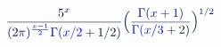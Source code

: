 \documentclass[12pt]{article}
\begin{document}
\makeatletter
\renewcommand*{\@textcolor}[3]{%
  \protect\leavevmode
  \begingroup
    \color#1{#2}#3%
  \endgroup
}
\makeatother
\begin{displaymath}
\mathcolor[RGB]{0,0,15}{\frac { \mathcolor[RGB]{0,0,30}{5} ^ { \mathcolor[RGB]{0,0,45}{x} } } { \mathcolor[RGB]{0,0,60}{(} \mathcolor[RGB]{0,0,75}{2} \mathcolor[RGB]{0,0,90}{\pi} \mathcolor[RGB]{0,0,105}{)} ^ { \mathcolor[RGB]{0,0,120}{\frac { \mathcolor[RGB]{0,0,135}{x} \mathcolor[RGB]{0,0,150}{-} \mathcolor[RGB]{0,0,165}{1} } { \mathcolor[RGB]{0,0,180}{2} } } } \mathcolor[RGB]{0,0,195}{\Gamma} \mathcolor[RGB]{0,0,210}{(} \mathcolor[RGB]{0,0,225}{x} \mathcolor[RGB]{0,0,240}{/} \mathcolor[RGB]{0,0,255}{2} \mathcolor[RGB]{0,15,0}{+} \mathcolor[RGB]{0,15,15}{1} \mathcolor[RGB]{0,15,30}{/} \mathcolor[RGB]{0,15,45}{2} \mathcolor[RGB]{0,15,60}{)} } } \mathcolor[RGB]{0,15,75}{\Big(} \mathcolor[RGB]{0,15,90}{\frac { \mathcolor[RGB]{0,15,105}{\Gamma} \mathcolor[RGB]{0,15,120}{(} \mathcolor[RGB]{0,15,135}{x} \mathcolor[RGB]{0,15,150}{+} \mathcolor[RGB]{0,15,165}{1} \mathcolor[RGB]{0,15,180}{)} } { \mathcolor[RGB]{0,15,195}{\Gamma} \mathcolor[RGB]{0,15,210}{(} \mathcolor[RGB]{0,15,225}{x} \mathcolor[RGB]{0,15,240}{/} \mathcolor[RGB]{0,15,255}{3} \mathcolor[RGB]{0,30,0}{+} \mathcolor[RGB]{0,30,15}{2} \mathcolor[RGB]{0,30,30}{)} } } \mathcolor[RGB]{0,30,45}{\Big)} ^ { \mathcolor[RGB]{0,30,60}{1} \mathcolor[RGB]{0,30,75}{/} \mathcolor[RGB]{0,30,90}{2} }
\end{displaymath}
\end{document}
